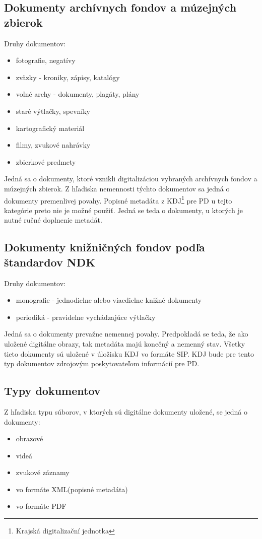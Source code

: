 \documentclass[
  print, %
  table,   %
  lof,     %
  nolot,     %
]{fithesis3}
\begin{document}
\subsection{Dokumenty archívnych fondov a múzejných zbierok}
Druhy dokumentov:
\begin{itemize}
	\item fotografie, negatívy				
	\item zväzky - kroniky, zápisy, katalógy
	\item voľné archy - dokumenty, plagáty, plány
	\item staré výtlačky, spevníky
	\item kartografický materiál 
	\item filmy, zvukové nahrávky 
	\item zbierkové predmety	
\end{itemize}
Jedná sa o dokumenty, ktoré vznikli digitalizáciou vybraných archívnych fondov a múzejných zbierok. Z hľadiska nemennosti týchto dokumentov sa jedná o dokumenty premenlivej povahy. Popisné metadáta z KDJ\footnote{Krajská digitalizační jednotka} pre PD u tejto kategórie preto nie je možné použiť. Jedná se teda o dokumenty, u ktorých je nutné ručné doplnenie metadát. 

\subsection{Dokumenty knižničných fondov podľa štandardov NDK}
Druhy dokumentov:
\begin{itemize}
	\item monografie - jednodielne alebo viacdielne knižné dokumenty			
	\item periodiká - pravidelne vychádzajúce výtlačky
\end{itemize}
Jedná sa o dokumenty prevažne nemennej povahy. Predpokladá se teda, že ako uložené digitálne obrazy, tak metadáta majú konečný a nemenný stav. Všetky tieto dokumenty sú uložené v úložisku KDJ vo formáte SIP. KDJ bude pre tento typ dokumentov zdrojovým poskytovateľom informácií pre PD. 
\subsection{Typy dokumentov} 
Z hľadiska typu súborov, v ktorých sú digitálne dokumenty uložené, se jedná o dokumenty:
\begin{itemize}
	\item obrazové			
	\item videá
	\item zvukové záznamy
	\item vo formáte XML(popisné metadáta)		
	\item vo formáte PDF
\end{itemize}
\end{document}

